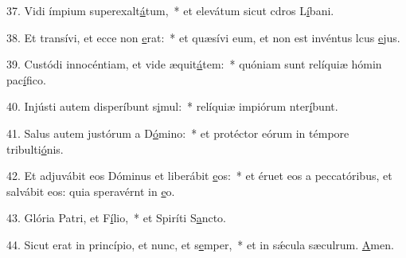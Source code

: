 37. Vidi ímpium superexalt\uline{á}tum,~* et elevátum sicut cdros L\uline{í}bani.\par 
38. Et transívi, et ecce non \uline{e}rat:~* et quæsívi eum, et non est invéntus lcus \uline{e}jus.\par 
39. Custódi innocéntiam, et vide æquit\uline{á}tem:~* quóniam sunt relíquiæ hómin pac\uline{í}fico.\par 
40. Injústi autem disperíbunt s\uline{i}mul:~* relíquiæ impiórum nter\uline{í}bunt.\par 
41. Salus autem justórum a D\uline{ó}mino:~* et protéctor eórum in témpore tribulti\uline{ó}nis.\par 
42. Et adjuvábit eos Dóminus et liberábit \uline{e}os:~* et éruet eos a peccatóribus, et salvábit eos: quia speravérnt in \uline{e}o.\par 
43. Glória Patri, et F\uline{í}lio,~* et Spiríti S\uline{a}ncto.\par 
44. Sicut erat in princípio, et nunc, et s\uline{e}mper,~* et in sǽcula sæculrum. \uline{A}men.\par 
